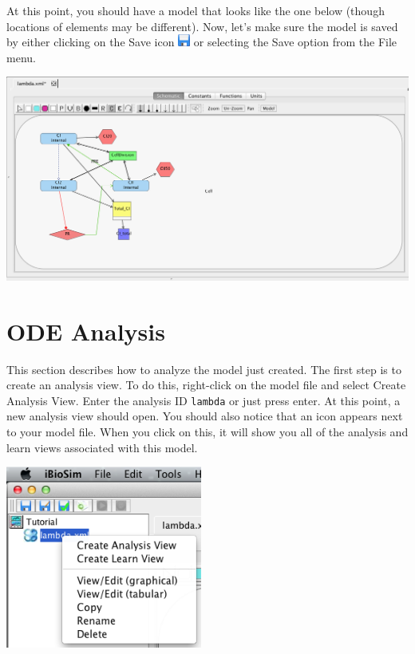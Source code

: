\documentclass[titlepage,11pt]{article}
\begin{document}
At this point, you should have a model that looks like the one below (though locations of elements may be different).  Now, let's make sure the model is saved by either clicking on the Save icon \includegraphics{../gui/icons/save} or selecting the Save option from the File menu.

\begin{center}
\includegraphics[width=160mm]{screenshots/save}
\end{center}

\section{ODE Analysis}

This section describes how to analyze the model just created.  The first step is to create an analysis view.  To do this, right-click on the model file and select Create Analysis View.  Enter the analysis ID {\tt lambda} or just press enter.  At this point, a new analysis view should open.  You should also notice that an icon appears next to your model file.  When you click on this, it will show you all of the analysis and learn views associated with this model.

\begin{center}
\includegraphics[height=60mm]{screenshots/GCMAnalysis}
\end{center}
\end{document}
